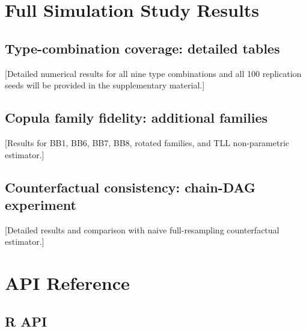 \documentclass[article]{jss}
\begin{document}


\appendix

\section{Full Simulation Study Results}
\label{app:sims}

\subsection{Type-combination coverage: detailed tables}

[Detailed numerical results for all nine type combinations and all 100 replication seeds will be provided in the supplementary material.]

\subsection{Copula family fidelity: additional families}

[Results for BB1, BB6, BB7, BB8, rotated families, and TLL non-parametric estimator.]

\subsection{Counterfactual consistency: chain-DAG experiment}

[Detailed results and comparison with naive full-resampling counterfactual estimator.]

\section{API Reference}
\label{sec:api}

\subsection{R API}
\end{document}
